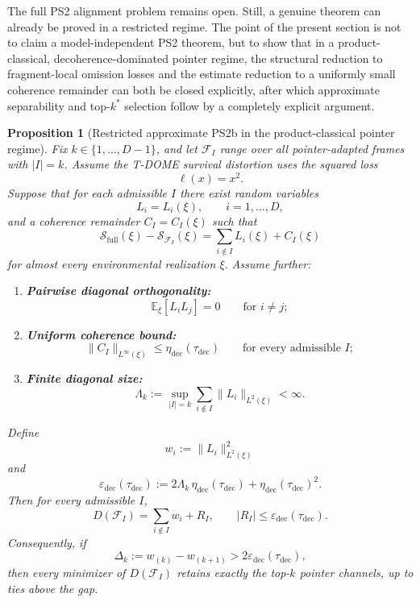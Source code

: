 \documentclass[12pt]{article}
\newtheorem{proposition}[theorem]{Proposition}
\theoremstyle{definition}
\theoremstyle{remark}
\begin{document}
The full PS2 alignment problem remains open. Still, a genuine theorem
can already be proved in a restricted regime. The point of the present
section is not to claim a model-independent PS2 theorem, but to show
that in a product-classical, decoherence-dominated pointer regime, the
structural reduction to fragment-local omission losses and the estimate
reduction to a uniformly small coherence remainder can both be closed
explicitly, after which approximate separability and top-\(k^*\)
selection follow by a completely explicit argument.

\begin{proposition}[Restricted approximate PS2b in the product-classical pointer regime]\label{prop:ps2_restricted}
Fix \(k\in\{1,\dots,D-1\}\), and let \(\mathcal F_I\) range over all
pointer-adapted frames with \(|I|=k\). Assume the T-DOME survival
distortion uses the squared loss
\[
\ell(x)=x^2.
\]
Suppose that for each admissible \(I\) there exist random variables
\[
L_i=L_i(\xi),
\qquad
i=1,\dots,D,
\]
and a coherence remainder \(C_I=C_I(\xi)\) such that
\[
\mathcal S_{\mathrm{full}}(\xi)-\mathcal S_{\mathcal F_I}(\xi)
=
\sum_{i\notin I} L_i(\xi)+C_I(\xi)
\]
for almost every environmental realization \(\xi\). Assume further:
\begin{enumerate}
\item \textbf{Pairwise diagonal orthogonality:}
  \[
  \mathbb E_\xi[L_iL_j]=0
  \qquad
  \text{for } i\neq j;
  \]
\item \textbf{Uniform coherence bound:}
  \[
  \|C_I\|_{L^\infty(\xi)}
  \le
  \eta_{\mathrm{dec}}(\tau_{\mathrm{dec}})
  \qquad
  \text{for every admissible } I;
  \]
\item \textbf{Finite diagonal size:}
  \[
  \Lambda_k
  :=
  \sup_{|I|=k}
  \sum_{i\notin I}\|L_i\|_{L^2(\xi)}
  <
  \infty.
  \]
\end{enumerate}
Define
\[
w_i:=\|L_i\|_{L^2(\xi)}^2
\]
and
\[
\varepsilon_{\mathrm{dec}}(\tau_{\mathrm{dec}})
:=
2\Lambda_k\,\eta_{\mathrm{dec}}(\tau_{\mathrm{dec}})
+\eta_{\mathrm{dec}}(\tau_{\mathrm{dec}})^2.
\]
Then for every admissible \(I\),
\[
D(\mathcal F_I)
=
\sum_{i\notin I} w_i + R_I,
\qquad
|R_I|
\le
\varepsilon_{\mathrm{dec}}(\tau_{\mathrm{dec}}).
\]
Consequently, if
\[
\Delta_k:=w_{(k)}-w_{(k+1)}
>
2\varepsilon_{\mathrm{dec}}(\tau_{\mathrm{dec}}),
\]
then every minimizer of \(D(\mathcal F_I)\) retains exactly the
top-\(k\) pointer channels, up to ties above the gap.
\end{proposition}
\end{document}
